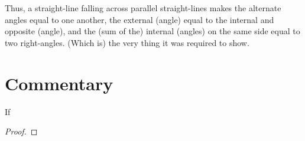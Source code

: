 Thus, a straight-line falling across parallel straight-lines makes the alternate angles
equal to one another,  the external (angle) equal to the internal and
opposite (angle), and the (sum of the) internal (angles) on the same side equal to
two right-angles. (Which is) the very thing it was required to show.


\section*{Commentary}

\begin{proposition}\label{proposition_29}\leanok
    If
\end{proposition}
\begin{proof}
    \leanok
\end{proof}
